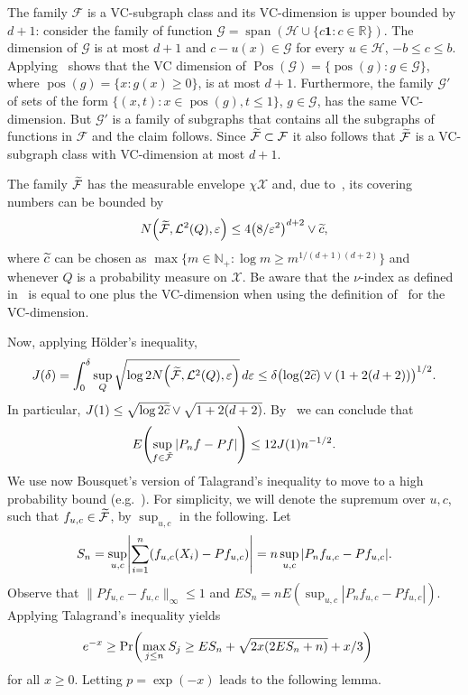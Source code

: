 \documentclass[10pt]{amsart}
\theoremstyle{definition}\newtheorem{defi}[theo]{Definition}\newtheorem{rema}[theo]{Remark}\newtheorem{exam}[theo]{Example}\newtheorem{exem}[theo]{Example}\newtheorem{nota}[theo]{Notation}
\theoremstyle{remark}
\DeclareMathOperator{\POS}{Pos}
\DeclareMathOperator{\pos}{pos}
\DeclareMathOperator{\spn}{span}
\newcommand{\R}{\mathbb{R}}
\newcommand{\bbN}{\mathbb{N}}
\newcommand{\X}{\mathcal{X}}
\newcommand{\cH}{\mathcal{H}}
\newcommand{\clL}{\mathcal{L}}
\newcommand{\clF}{\mathcal{F}}
\newcommand{\clG}{\mathcal{G}}
\let\oldtilde\tilde
\renewcommand*{\tilde}[1]{\mathchoice{\widetilde{#1}}{\widetilde{#1}}{\oldtilde{#1}}{\oldtilde{#1}}}
\let\originalleft\left
\let\originalright\right
\renewcommand{\left}{\mathopen{}\mathclose\bgroup\originalleft}
\renewcommand{\right}{\aftergroup\egroup\originalright}
\begin{document}
The family $\clF$ is a VC-subgraph class and its VC-dimension is upper bounded by $d+1$: consider the family of function $\clG = \spn(\cH \cup \{ c\bm 1 : c \in \R \})$. The dimension of $\clG$ is at most $d+1$ and $c - u(x) \in \clG$ for every $u \in \cH$, $-b \leq c \leq b$. Applying~\cite[Theorem~4.6]{DUDLEY14} shows that the VC dimension of $\POS(\clG) = \{ \pos(g) : g \in \clG\}$, where $\pos(g) = \{x: g(x) \geq 0 \}$, is at most $d+1$. Furthermore, the family $\clG'$ of sets of the form $\{(x,t) : x \in \pos(g), t \leq 1\}$, $g \in \clG$, has the same VC-dimension. But $\clG'$ is a family of subgraphs that contains all the subgraphs of functions in $\clF$ and the claim follows. Since $\tilde{\clF} \subset \clF$ it also follows that $\tilde{\clF}$ is a VC-subgraph class with VC-dimension at most $d+1$.

The family $\tilde{\clF}$ has the measurable envelope $\chi \X$ and, due to~\cite[Theorem~3.6.9]{GINE15}, its covering numbers can be bounded by
\[
N\left(\tilde{\clF},\clL^2(Q),\varepsilon\right) \leq 4 \left(8/\varepsilon^2\right)^{d+2} \vee \tilde c,
\]
where $\tilde c$ can be chosen as $\max\{m\in \bbN_+ : \log m \geq m^{1/(d+1)(d+2)} \}$ and whenever $Q$ is a probability measure on $\X$. Be aware that the $\nu$-index as defined in~\cite{GINE15} is equal to one plus the VC-dimension when using the definition of~\cite{DUDLEY14} for the VC-dimension.

Now, applying H\"older's inequality,
\begin{align*}
J(\delta) = \int_0^\delta \sup_Q \sqrt{\log 2 N\left(\tilde{\clF},\clL^2(Q),\varepsilon\right)} \, d\varepsilon
\leq \delta \bigl(
\log(2\tilde c)
\vee (1 + 2(d+2))
\bigr)^{1/2}.
\end{align*}
In particular, $J(1) \leq \sqrt{\log 2\tilde c} \vee \sqrt{1+ 2(d+2)}$. By~\cite[Remark~3.5.5 and Theorem~3.5.4]{GINE15} we can conclude that
\[
E\left(\sup_{f \in \tilde{\clF}} |P_n f - P f|\right) \leq 12 J(1) n^{-1/2}.
\]
We use now Bousquet's version of Talagrand's inequality to move to a high probability bound (e.g.~\cite[Theorem~3.3.9]{GINE15}). For simplicity, we will denote the supremum over $u,c$, such that $f_{u,c} \in \tilde{\clF}$, by $\sup_{u,c}$ in the following. Let
\[
S_n = \sup_{u,c} \left|\sum_{i=1}^n (f_{u,c}(X_i)- Pf_{u,c})\right|= n \sup_{u,c} | P_n f_{u,c} - P f_{u,c}|.
\]
Observe that $\| Pf_{u,c} - f_{u,c}\|_{\infty} \leq 1$ and $E S_n = n E(\sup_{u,c} |P_n f_{u,c} - P f_{u,c}|)$. Applying Talagrand's inequality yields
\begin{align*}
e^{-x} &\geq \Pr\left(\max_{j\leq n} S_j \geq E S_n + \sqrt{2x(2 E S_n + n)} +x/3 \right)
\end{align*}
for all $x\geq 0$. Letting $p = \exp(-x)$ leads to the following lemma.
\end{document}
